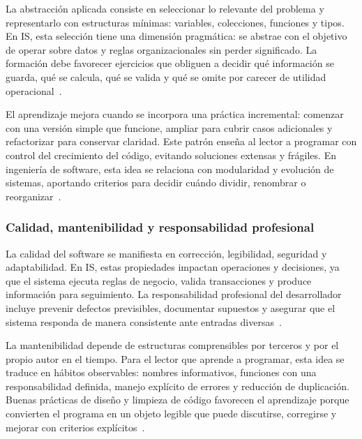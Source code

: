 \documentclass[12pt,twoside]{book}
\begin{document}
						La abstracción aplicada consiste en seleccionar lo relevante del problema y representarlo con estructuras mínimas: variables, colecciones, funciones y tipos. En IS, esta selección tiene una dimensión pragmática: se abstrae con el objetivo de operar sobre datos y reglas organizacionales sin perder significado. La formación debe favorecer ejercicios que obliguen a decidir qué información se guarda, qué se calcula, qué se valida y qué se omite por carecer de utilidad operacional~\cite{Laudon2020Management,Bernstein2009Data,Perkovic2010Framework}.
						
						El aprendizaje mejora cuando se incorpora una práctica incremental: comenzar con una versión simple que funcione, ampliar para cubrir casos adicionales y refactorizar para conservar claridad. Este patrón enseña al lector a programar con control del crecimiento del código, evitando soluciones extensas y frágiles. En ingeniería de software, esta idea se relaciona con modularidad y evolución de sistemas, aportando criterios para decidir cuándo dividir, renombrar o reorganizar~\cite{Martin2008Clean,Ghezzi2003Fundamentals,Sommerville2015Software}.
						
					\subsubsection{Calidad, mantenibilidad y responsabilidad profesional}
						\noindent
						La calidad del software se manifiesta en corrección, legibilidad, seguridad y adaptabilidad. En IS, estas propiedades impactan operaciones y decisiones, ya que el sistema ejecuta reglas de negocio, valida transacciones y produce información para seguimiento. La responsabilidad profesional del desarrollador incluye prevenir defectos previsibles, documentar supuestos y asegurar que el sistema responda de manera consistente ante entradas diversas~\cite{Ghezzi2003Fundamentals,Pressman2019Software,ISO247722024Programming}.
						
						La mantenibilidad depende de estructuras comprensibles por terceros y por el propio autor en el tiempo. Para el lector que aprende a programar, esta idea se traduce en hábitos observables: nombres informativos, funciones con una responsabilidad definida, manejo explícito de errores y reducción de duplicación. Buenas prácticas de diseño y limpieza de código favorecen el aprendizaje porque convierten el programa en un objeto legible que puede discutirse, corregirse y mejorar con criterios explícitos~\cite{Martin2008Clean,Sommerville2015Software,Gaddis2022Starting}.
						
\end{document}

